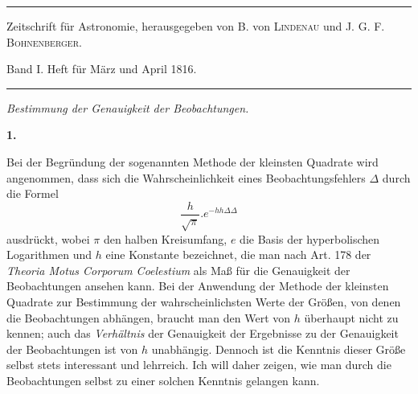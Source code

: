 \clearpage
{}
\begin{center}
\rule{.8\linewidth}{.3pt}\par\smallskip
{\small Zeitschrift für Astronomie, herausgegeben von B. von \textsc{Lindenau} und J. G. F. \textsc{Bohnenberger}.\par
Band I. Heft für März und April 1816.\par}
\smallskip\rule{.8\linewidth}{.3pt}\par\bigskip
{\large\itshape Bestimmung der Genauigkeit der Beobachtungen.\par}
\end{center}
\renewcommand{\Article}[1]{\par\medskip\Needspace{4\baselineskip}\pdfbookmark[1]{Art. #1}{genauigkeit-art-#1}\centerline{\textbf{#1.}}\nobreak\smallskip}
\Article{1}
Bei der Begründung der sogenannten Methode der kleinsten Quadrate wird angenommen, dass sich die Wahrscheinlichkeit eines Beobachtungsfehlers \(\Delta\) durch die Formel
\[
\frac{h}{\surd\pi}.e^{-hh\Delta\Delta}
\]
ausdrückt, wobei \(\pi\) den halben Kreisumfang, \(e\) die Basis der hyperbolischen Logarithmen und \(h\) eine Konstante bezeichnet, die man nach Art. 178 der \textit{Theoria Motus Corporum Coelestium} als Maß für die Genauigkeit der Beobachtungen ansehen kann. Bei der Anwendung der Methode der kleinsten Quadrate zur Bestimmung der wahrscheinlichsten Werte der Größen, von denen die Beobachtungen abhängen, braucht man den Wert von \(h\) überhaupt nicht zu kennen; auch das \textit{Verhältnis} der Genauigkeit der Ergebnisse zu der Genauigkeit der Beobachtungen ist von \(h\) unabhängig. Dennoch ist die Kenntnis dieser Größe selbst stets interessant und lehrreich. Ich will daher zeigen, wie man durch die Beobachtungen selbst zu einer solchen Kenntnis gelangen kann.

